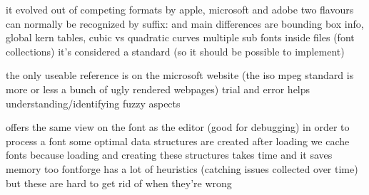     \startitemize
        \startitem
            it evolved out of competing formats by apple, microsoft and adobe
        \stopitem
        \startitem
            two flavours can normally be recognized by suffix:  and
        \stopitem
        \startitem
            main differences are bounding box info, global kern tables, cubic vs
            quadratic curves
        \stopitem
        \startitem
            multiple sub fonts inside  files (font collections)
        \stopitem
        \startitem
            it's considered a standard (so it should be possible to implement)
        \stopitem
    \stopitemize

\stopsubject

\startsubject[title={the specification}]

    \startitemize
        \startitem
            the only useable reference is on the microsoft website
        \stopitem
        \startitem
            (the iso mpeg standard is more or less a bunch of ugly rendered
            webpages)
        \stopitem
        \startitem
            trial and error helps understanding/identifying fuzzy aspects
        \stopitem
    \stopitemize

\stopsubject

\stoptitle

\starttitle[title={the available loaders}]

\startsubject[title={the fontforge loader}]

    \startitemize
        \startitem
            offers the same view on the font as the editor (good for debugging)
        \stopitem
        \startitem
            in order to process a font some optimal data structures are created
            after loading
        \stopitem
        \startitem
            we cache fonts because loading and creating these structures takes
            time and it saves memory too
        \stopitem
        \startitem
            fontforge has a lot of heuristics (catching issues collected over
            time) but these are hard to get rid of when they're wrong
        \stopitem
    \stopitemize

\stopsubject

\startsubject[title={the lua loader}]

